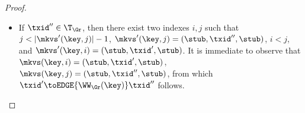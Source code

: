 \begin{proof}
\begin{enumerate}
\begin{itemize}
\begin{itemize}
\item If $\txid'' \in \T_{\Gr}$, then there exist two indexes $i,j$ such that 
$j < \lvert \mkvs'(\key, j) \rvert - 1$, $\mkvs'(\key, j) = (\stub, \txid'', \stub)$, 
$i < j$, and $\mkvs'(\key, i) = (\stub, \txid', \stub)$. It is immediate to observe 
that $\mkvs(\key, i) = (\stub, \txid', \stub)$, $\mkvs(\key, j) = (\stub, \txid'', \stub)$, 
from which $\txid' \toEDGE{\WW_{\Gr}(\key)} \txid''$ follows. 
\end{itemize}
\end{itemize}

\end{enumerate}
\end{proof}
